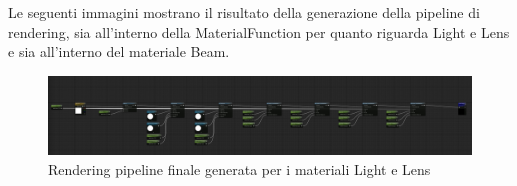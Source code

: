 \documentclass[main.tex]{subfiles}
\begin{document}
Le seguenti immagini mostrano il risultato della generazione  della pipeline di rendering, sia all'interno della MaterialFunction per quanto riguarda Light e Lens e sia all'interno del materiale Beam.
\begin{figure}[H]
    \centering
    \includegraphics[width=1\linewidth]{img/newFeatures/renderPipeline.jpg}
    \caption{Rendering pipeline finale generata per i materiali Light e Lens}
    \label{fig:5_finalRenderingPipeline}
\end{figure}
\end{document}
